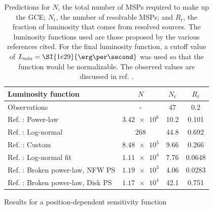 \documentclass{C://Aliases//Dropbox-MIT//Latex_Templates//personal}
\begin{document}
\begin{table}
    \begin{subtable}[h]{0.9\textwidth}
        \centering
        \begin{tabular}{|l|c|c|c|}
            \hline
            Luminosity function & $N$ & $N_\text{r}$ & $R_\text{r}$ \\ \hline
            Observations & - & 47 & 0.2 \\
            Ref. \cite{Zhong:2019ycb}: Power-law & $\num{3.42e6}$ & 10.2 & 0.101 \\
            Ref. \cite{osti_1305131}: Log-normal & 268 & 44.8 & 0.692 \\
            Ref. \cite{Ploeg:2020jeh}: Custom  & $\num{8.48e3}$ & 9.66 & 0.266 \\
            Ref. \cite{Ploeg:2020jeh}: Log-normal fit  & $\num{1.11e4}$ & 7.76 & 0.0648 \\
            Ref. \cite{Lee:2015fea}: Broken power-law, NFW PS & $\num{1.19e3}$ & 4.06 & 0.0283 \\
            Ref. \cite{Lee:2015fea}: Broken power-law, Disk PS & $\num{1.17e4}$ & 42.1 & 0.751 \\ \hline
        \end{tabular}
        \caption{Results for a position-dependent sensitivity function}
        \label{tab:position}
    \end{subtable}
    \caption{Predictions for $N$, the total number of MSPs required to make up the GCE; $N_\text{r}$, the number of resolvable MSPs; and $R_\text{r}$, the fraction of luminosity that comes from resolved sources. The luminosity functions used are those proposed by the various references cited. For the final luminosity function, a cutoff value of $L_\text{min}=\SI{1e29}{\erg\per\second}$ was used so that the function would be normalizable. The observed values are discussed in ref. \cite{Zhong:2019ycb}.}
    \label{tab:point-results}
\end{table}
\end{document}
